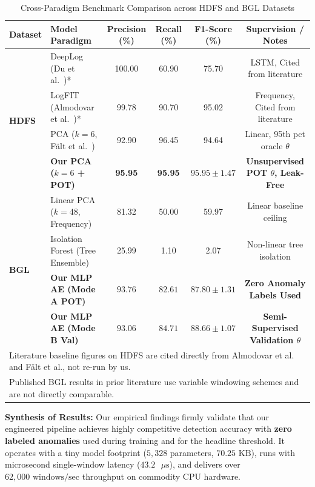 \begin{table}[htbp]
\centering
\caption{Cross-Paradigm Benchmark Comparison across HDFS and BGL Datasets}
\label{tab:literature_comparison}
\begin{tabular}{llcccc}
\toprule
\textbf{Dataset} & \textbf{Model Paradigm} & \textbf{Precision (\%)} & \textbf{Recall (\%)} & \textbf{F1-Score (\%)} & \textbf{Supervision / Notes} \\
\midrule
\multirow{4}{*}{\textbf{HDFS}} & DeepLog (Du et al.~\cite{du2017deeplog})* & 100.00 & 60.90 & 75.70 & LSTM, Cited from literature \\
& LogFIT (Almodovar et al.~\cite{almodovar2024logfit})* & 99.78 & 90.70 & 95.02 & Frequency, Cited from literature \\
& PCA ($k=6$, F{\"a}lt et al.~\cite{falt2025lightweight}) & 92.90 & 96.45 & 94.64 & Linear, 95th pct oracle $\theta$ \\
& \textbf{Our PCA ($k=6$ + POT)} & \textbf{95.95} & \textbf{95.95} & $\mathbf{95.95 \pm 1.47}$ & \textbf{Unsupervised POT $\theta$, Leak-Free} \\
\midrule
\multirow{4}{*}{\textbf{BGL}} & Linear PCA ($k=48$, Frequency) & 81.32 & 50.00 & 59.97 & Linear baseline ceiling \\
& Isolation Forest (Tree Ensemble) & 25.99 & 1.10 & 2.07 & Non-linear tree isolation \\
& \textbf{Our MLP AE (Mode A POT)} & $\mathbf{93.76}$ & $\mathbf{82.61}$ & $\mathbf{87.80 \pm 1.31}$ & \textbf{Zero Anomaly Labels Used} \\
& \textbf{Our MLP AE (Mode B Val)} & $\mathbf{93.06}$ & $\mathbf{84.71}$ & $\mathbf{88.66 \pm 1.07}$ & \textbf{Semi-Supervised Validation $\theta$} \\
\bottomrule
\multicolumn{6}{l}{\footnotesize *Literature baseline figures on HDFS are cited directly from Almodovar et al. and F{\"a}lt et al., not re-run by us.} \\
\multicolumn{6}{l}{\footnotesize Published BGL results in prior literature use variable windowing schemes and are not directly comparable.}
\end{tabular}
\end{table}

\textbf{Synthesis of Results:}
Our empirical findings firmly validate that our engineered pipeline achieves highly competitive detection accuracy with \textbf{zero labeled anomalies} used during training and for the headline threshold. It operates with a tiny model footprint ($5,328$ parameters, $70.25\text{ KB}$), runs with microsecond single-window latency ($43.2\text{ }\mu\text{s}$), and delivers over $62,000\text{ windows/sec}$ throughput on commodity CPU hardware.

